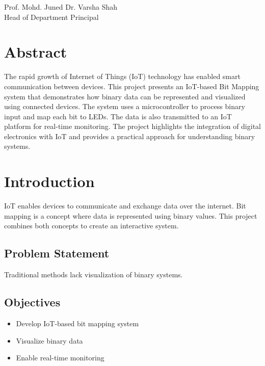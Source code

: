 \documentclass[12pt,a4paper,twoside]{report}
\begin{document}
	\vspace{2cm}
	
	\begin{center}
		Prof. Mohd. Juned \hspace{4cm} Dr. Varsha Shah\\
		Head of Department \hspace{3cm} Principal
	\end{center}
	
	\chapter*{Abstract}
	
	The rapid growth of Internet of Things (IoT) technology has enabled smart communication between devices. This project presents an IoT-based Bit Mapping system that demonstrates how binary data can be represented and visualized using connected devices. The system uses a microcontroller to process binary input and map each bit to LEDs. The data is also transmitted to an IoT platform for real-time monitoring. The project highlights the integration of digital electronics with IoT and provides a practical approach for understanding binary systems.
	
	\newpage
	\tableofcontents
	\newpage
	
	\chapter{Introduction}
	
	IoT enables devices to communicate and exchange data over the internet. Bit mapping is a concept where data is represented using binary values. This project combines both concepts to create an interactive system.
	
	\section{Problem Statement}
	Traditional methods lack visualization of binary systems.
	
	\section{Objectives}
	\begin{itemize}
		\item Develop IoT-based bit mapping system
		\item Visualize binary data
		\item Enable real-time monitoring
	\end{itemize}
	
\end{document}
